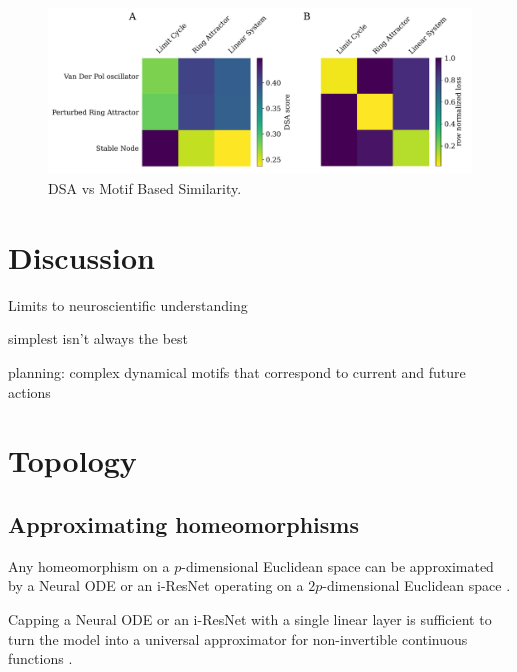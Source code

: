 \documentclass{article}
\theoremstyle{definition} \newtheorem{definition}{Definition}  \newtheorem{example}{Example}
\theoremstyle{remark} \newtheorem{remark}{Remark}
\newcounter{ct}
\begin{document}
\begin{figure}[htbp]
    \centering
    \includegraphics[width=0.75\linewidth]{dsa_vs_mbs}
    \caption{DSA vs Motif Based Similarity.}
    \label{fig:ds_vs_mbs}
\end{figure}




\section{Discussion}

Limits to neuroscientific understanding \citep{chirimuuta2024brain}


simplest isn't always the best \citep{dyer2023simplest}


planning: complex dynamical motifs that correspond to current and future actions \citep{vyas2020ctd}


\newpage




\newpage
\appendix


\section{Topology}\label{sec:topology}

\subsection{Approximating homeomorphisms}\label{sec:homeomorphisms}


Any homeomorphism on a $p$-dimensional Euclidean space can be approximated by a Neural ODE or an i-ResNet operating on a $2p$-dimensional Euclidean space \citep{zhang2020approximation}.

Capping a Neural ODE or an i-ResNet with a single linear layer is sufficient to turn the model into a universal approximator for non-invertible continuous functions \citep{zhang2020approximation}.
\end{document}

